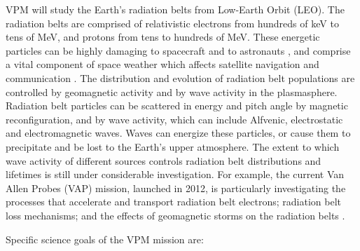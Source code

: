 VPM will study the Earth's radiation belts from Low-Earth Orbit (LEO). The radiation belts are comprised of relativistic electrons from hundreds of keV to tens of MeV, and protons from tens to hundreds of MeV. These energetic particles can be highly damaging to spacecraft and to astronauts \citep[e.g.][]{Barth2003}, and comprise a vital component of space weather which affects satellite navigation and communication \citep{Bothmer:2007}. The distribution and evolution of radiation belt populations are controlled by geomagnetic activity and by wave activity in the plasmasphere. Radiation belt particles can be scattered in energy and pitch angle by magnetic reconfiguration, and by wave activity, which can include Alfvenic, electrostatic and electromagnetic waves. Waves can energize these particles, or cause them to precipitate and be lost to the Earth's upper atmosphere. The extent to which wave activity of different sources controls radiation belt distributions and lifetimes is still under considerable investigation. For example, the current Van Allen Probes (VAP) mission, launched in 2012, is particularly investigating the processes that accelerate and transport radiation belt electrons; radiation belt loss mechanisms; and the effects of geomagnetic storms on the radiation belts \citep{Spence2014}. %

Specific science goals of the VPM mission are:

